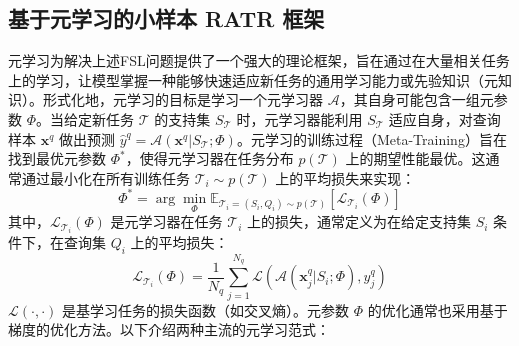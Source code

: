 \subsection{基于元学习的小样本 RATR 框架}
\label{subsec:meta_learning_framework}

元学习为解决上述FSL问题提供了一个强大的理论框架，旨在通过在大量相关任务上的学习，让模型掌握一种能够快速适应新任务的通用学习能力或先验知识（元知识）。形式化地，元学习的目标是学习一个元学习器 $\mathcal{A}$，其自身可能包含一组元参数 $\Phi$。当给定新任务 $\mathcal{T}$ 的支持集 $S_{\mathcal{T}}$ 时，元学习器能利用 $S_{\mathcal{T}}$ 适应自身，对查询样本 $\mathbf{x}^q$ 做出预测 $\hat{y}^q = \mathcal{A}(\mathbf{x}^q | S_{\mathcal{T}}; \Phi)$。元学习的训练过程（Meta-Training）旨在找到最优元参数 $\Phi^*$，使得元学习器在任务分布 $p(\mathcal{T})$ 上的期望性能最优。这通常通过最小化在所有训练任务 $\mathcal{T}_i \sim p(\mathcal{T})$ 上的平均损失来实现：
\begin{equation}
    \Phi^* = \arg\min_{\Phi} \mathbb{E}_{\mathcal{T}_i=(S_i, Q_i) \sim p(\mathcal{T})} [\mathcal{L}_{\mathcal{T}_i}(\Phi)]
    \label{eq:meta_objective}
\end{equation}
其中，$\mathcal{L}_{\mathcal{T}_i}(\Phi)$ 是元学习器在任务 $\mathcal{T}_i$ 上的损失，通常定义为在给定支持集 $S_i$ 条件下，在查询集 $Q_i$ 上的平均损失：
\begin{equation}
    \mathcal{L}_{\mathcal{T}_i}(\Phi) = \frac{1}{N_q} \sum_{j=1}^{N_q} \mathcal{L}( \mathcal{A}(\mathbf{x}_j^q | S_i; \Phi), y_j^q )
    \label{eq:task_loss_meta}
\end{equation}
$\mathcal{L}(\cdot, \cdot)$ 是基学习任务的损失函数（如交叉熵）。元参数 $\Phi$ 的优化通常也采用基于梯度的优化方法。以下介绍两种主流的元学习范式：

